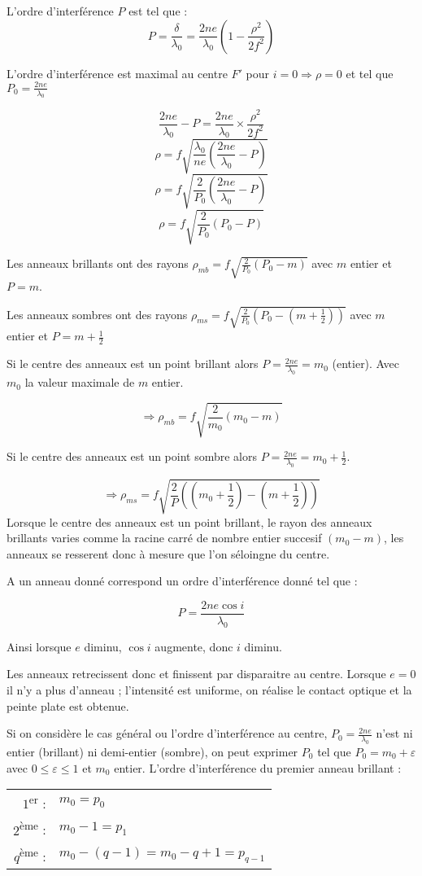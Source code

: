 \documentclass[a4paper,12pt]{article}
\theoremstyle{StyleTheo_will}
\theoremstyle{remark}
\begin{document}
L'ordre d'interférence $P$ est tel que :     
\[ P = \frac{\delta}{\lambda_0} = \frac{2ne}{\lambda_0}\left( 1-\frac{\rho^2}{2f^2}\right)\]


L'ordre d'interférence est maximal au centre $F'$ pour $i = 0 \Rightarrow \rho =0$ et tel que $P_0 = \frac{2ne}{\lambda_0}$

\[\frac{2ne}{\lambda_0} - P = \frac{2ne}{\lambda_0}\times\frac{\rho^2}{2f^2}\]
\[\rho = f\sqrt{\frac{\lambda_0}{ne}\left(\frac{2ne}{\lambda_0} - P\right)}\]
\[\rho = f\sqrt{\frac{2}{P_0}\left(\frac{2ne}{\lambda_0} - P\right)}\]
\[\rho = f\sqrt{\frac{2}{P_0}\left(P_0 - P\right)}\]

Les anneaux brillants ont des rayons $\rho_{mb}=f\sqrt{\frac{2}{P_0}\left(P_0 - m\right)} $ avec $m$ entier et $P=m$.

Les anneaux sombres ont des rayons $\rho_{ms}=f\sqrt{\frac{2}{P_0}\left(P_0 - \left(m +\frac{1}{2}\right)\right)} $ avec $m$ entier et $P=m +\frac{1}{2}$

Si le centre des anneaux est un point brillant alors $P = \frac{2ne}{\lambda_0} = m_0$ (entier). Avec $m_0$ la valeur maximale de $m$ entier.

\[\Rightarrow \rho_{mb}=f\sqrt{\frac{2}{m_0}\left(m_0 - m\right)}\]

Si le centre des anneaux est un point sombre alors $P = \frac{2ne}{\lambda_0} = m_0 + \frac{1}{2}$. 

\[\Rightarrow \rho_{ms}=f\sqrt{\frac{2}{P}\left(\left(m_0 + \frac{1}{2}\right) - \left(m + \frac{1}{2}\right)\right)}\]
Lorsque le centre des anneaux est un point brillant, le rayon des anneaux brillants varies comme la racine carré de nombre entier succesif $(m_0-m)$, les anneaux se resserent donc à mesure que l'on séloingne du centre.

A un anneau donné correspond un ordre d'interférence donné tel que  :

\[P = \frac{2ne \cos i}{\lambda_0}\]

Ainsi lorsque $e$ diminu, $\cos i$ augmente, donc $i$ diminu.

Les anneaux retrecissent donc et finissent par disparaitre au centre. Lorsque $e = 0$ il n'y a plus d'anneau ; l'intensité est uniforme, on réalise le contact optique et la peinte plate est obtenue.

Si on considère le cas général ou l'ordre d'interférence au centre, $P_0 = \frac{2ne}{\lambda_0 }$ n'est ni entier (brillant) ni demi-entier (sombre), on peut exprimer $P_0$ tel que $P_0 = m_0 + \varepsilon$ avec $0\leqslant \varepsilon\leqslant 1$ et $m_0$ entier. 
L'ordre d'interférence du premier anneau brillant : 
\begin{center}
\begin{tabular}{ r l}
  $1$\textsuperscript{er} : & $m_0 = p_0$ \\
  $2$\textsuperscript{ème} : & $m_0 - 1 = p_1$ \\
  $q$\textsuperscript{ème} : & $m_0 -(q - 1) = m_0 -q + 1 = p_{q-1}$
\end{tabular}
\end{center}
\end{document}
